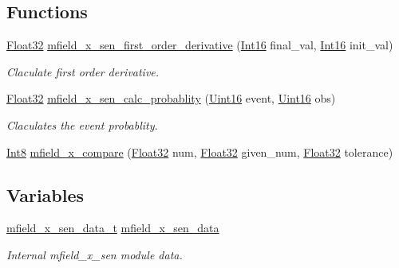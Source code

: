 \subsection*{Functions}
\begin{DoxyCompactItemize}
\item 
\hyperlink{a00072_a87d38f886e617ced2698fc55afa07637}{Float32} \hyperlink{a00025_a3107eb45e1fcd2dcdfc54498c528a6a5}{mfield\+\_\+x\+\_\+sen\+\_\+first\+\_\+order\+\_\+derivative} (\hyperlink{a00072_a659ce9e5eb6571f9984ffc7caad2660a}{Int16} final\+\_\+val, \hyperlink{a00072_a659ce9e5eb6571f9984ffc7caad2660a}{Int16} init\+\_\+val)
\begin{DoxyCompactList}\small\item\em Claculate first order derivative. \end{DoxyCompactList}\item 
\hyperlink{a00072_a87d38f886e617ced2698fc55afa07637}{Float32} \hyperlink{a00025_a51b6db21b0a9cbb8255cc4cfda81fad8}{mfield\+\_\+x\+\_\+sen\+\_\+calc\+\_\+probablity} (\hyperlink{a00072_a59a9f6be4562c327cbfb4f7e8e18f08b}{Uint16} event, \hyperlink{a00072_a59a9f6be4562c327cbfb4f7e8e18f08b}{Uint16} obs)
\begin{DoxyCompactList}\small\item\em Claculates the event probablity. \end{DoxyCompactList}\item 
\hyperlink{a00072_a7e31ca7716b8d85dd473450a5c5e5a97}{Int8} \hyperlink{a00025_a44dbd44e6cfef004d281e632f3e3070d}{mfield\+\_\+x\+\_\+compare} (\hyperlink{a00072_a87d38f886e617ced2698fc55afa07637}{Float32} num, \hyperlink{a00072_a87d38f886e617ced2698fc55afa07637}{Float32} given\+\_\+num, \hyperlink{a00072_a87d38f886e617ced2698fc55afa07637}{Float32} tolerance)
\end{DoxyCompactItemize}
\subsection*{Variables}
\begin{DoxyCompactItemize}
\item 
\hyperlink{a00025_d8/de9/a00595}{mfield\+\_\+x\+\_\+sen\+\_\+data\+\_\+t} \hyperlink{a00025_af8c531b1ba5fea148fb9111e06058f92}{mfield\+\_\+x\+\_\+sen\+\_\+data}
\begin{DoxyCompactList}\small\item\em Internal mfield\+\_\+x\+\_\+sen module data. \end{DoxyCompactList}\end{DoxyCompactItemize}


